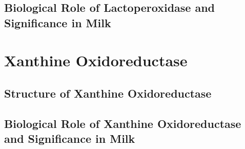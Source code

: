 \subsection*{Biological Role of Lactoperoxidase and Significance in Milk}


\section{Xanthine Oxidoreductase}


\subsection*{Structure of Xanthine Oxidoreductase}



\subsection*{Biological Role of Xanthine Oxidoreductase and Significance in Milk}

 

